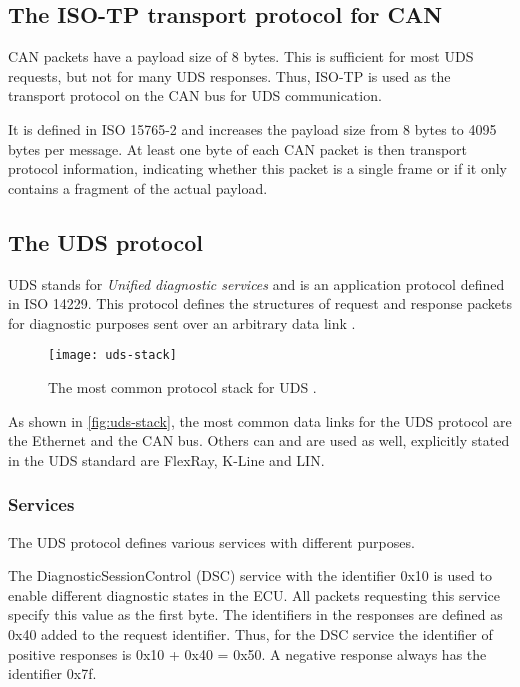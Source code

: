 \subsection{The ISO-TP transport protocol for CAN}

CAN packets have a payload size of 8 bytes. This is sufficient for most UDS requests, but not for many UDS responses. Thus, ISO-TP is used as the transport protocol on the CAN bus for UDS communication.

It is defined in ISO 15765-2 and increases the payload size from 8 bytes to 4095 bytes per message. At least one byte of each CAN packet is then transport protocol information, indicating whether this packet is a single frame or if it only contains a fragment of the actual payload.

\subsection{The UDS protocol}

UDS stands for \emph{Unified diagnostic services} and is an application protocol defined in ISO 14229. This protocol defines the structures of request and response packets for diagnostic purposes sent over an arbitrary data link \cite{iso14229}.

\begin{figure}[h]
    \centering
    \texttt{[image: uds-stack]}
    \caption{The most common protocol stack for UDS \cite{Weiss2020}.}
    \label{fig:uds-stack}
\end{figure}

As shown in \autoref{fig:uds-stack}, the most common data links for the UDS protocol are the Ethernet and the CAN bus. Others can and are used as well, explicitly stated in the UDS standard are FlexRay, K-Line and LIN.

\subsubsection{Services}

The UDS protocol defines various services with different purposes.

The DiagnosticSessionControl (DSC) service with the identifier 0x10 is used to enable different diagnostic states in the ECU. All packets requesting this service specify this value as the first byte. The identifiers in the responses are defined as 0x40 added to the request identifier. Thus, for the DSC service the identifier of positive responses is 0x10 + 0x40 = 0x50. A negative response always has the identifier 0x7f.

